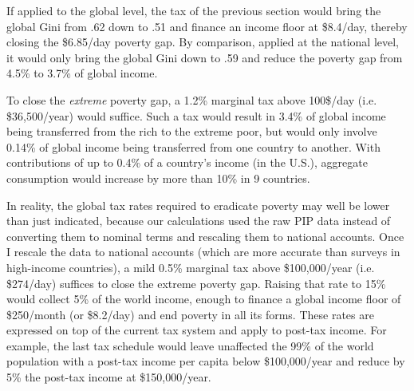 If applied to the global level, the tax of the previous section would bring the global Gini from .62 down to .51 and finance an income floor at \$8.4/day, thereby closing the \$6.85/day poverty gap. By comparison, applied at the national level, it would only bring the global Gini down to .59 and reduce the poverty gap from 4.5\% to 3.7\% of global income. 

To close the \textit{extreme} poverty gap, a 1.2\% marginal tax %
above 100\$/day (i.e. \$36,500/year) would suffice. %
Such a tax would result in 3.4\% of global income being transferred from the rich to the extreme poor, but would only involve 0.14\% of global income being transferred from one country to another. 
With contributions of up to 0.4\% of a country's income (in the U.S.), aggregate consumption would increase by more than 10\% in 9 countries. 

In reality, the global tax rates required to eradicate poverty may well be lower than just indicated, because our calculations used the raw PIP data instead of converting them to nominal terms and rescaling them to national accounts. Once I rescale the data to national accounts (which are more accurate than surveys in high-income countries), %
a mild 0.5\% marginal tax above \$100,000/year (i.e. \$274/day) suffices to close the extreme poverty gap. Raising that rate to 15\% would collect 5\% of the world income, enough to finance a global income floor of \$250/month (or \$8.2/day) and end poverty in all its forms. 
These rates are expressed on top of the current tax system and apply to post-tax income. For example, the last tax schedule would leave unaffected the 99\% of the world population with a post-tax income per capita below \$100,000/year and reduce by 5\% the post-tax income at \$150,000/year. %

